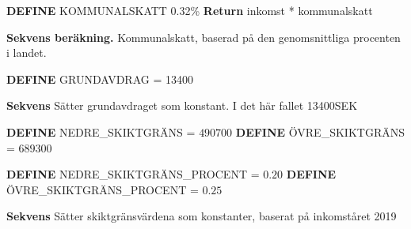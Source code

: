 \documentclass[../main.tex]{subfiles}
\begin{document}
\begin{algorithm}[H]
\SetAlgoLined


 \textbf{DEFINE} KOMMUNALSKATT 0.32\%\;
 \textbf{Return} inkomst * kommunalskatt\;
 
 \caption{\textbf{Sekvens beräkning.} Kommunalskatt, baserad på den genomsnittliga procenten i landet.}
 
\end{algorithm}

\begin{algorithm}[H]
\SetAlgoLined


 \textbf{DEFINE} GRUNDAVDRAG = 13400 \;
 
 \caption{\textbf{Sekvens} Sätter grundavdraget som konstant. I det här fallet 13400SEK}
 
\end{algorithm}

\begin{algorithm}[H]
\SetAlgoLined


 \textbf{DEFINE} NEDRE\_SKIKTGRÄNS = $490700$ \;
 \textbf{DEFINE} ÖVRE\_SKIKTGRÄNS = $689300$ \;
 
 \textbf{DEFINE} NEDRE\_SKIKTGRÄNS\_PROCENT = $0.20$ \;
 \textbf{DEFINE} ÖVRE\_SKIKTGRÄNS\_PROCENT = $0.25$ \;
 \caption{\textbf{Sekvens} Sätter skiktgränsvärdena som konstanter, baserat på inkomståret 2019}
 
\end{algorithm}
\end{document}
